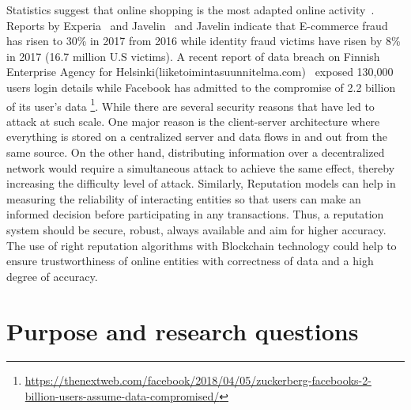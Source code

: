 Statistics suggest that online shopping is the most adapted online
activity~\cite{experian}. Reports by Experia~\cite{experian} and
Javelin~\cite{javelin} and Javelin indicate that E-commerce fraud has risen to
30\% in 2017 from 2016 while identity fraud victims have risen by 8\% in 2017
(16.7 million U.S victims). 
A recent report of data breach on Finnish Enterprise Agency for
Helsinki(liiketoimintasuunnitelma.com)~\cite{finland} exposed 130,000 users login details
while Facebook has admitted to the compromise of 2.2 billion of its user's data
\footnote{\url{https://thenextweb.com/facebook/2018/04/05/zuckerberg-facebooks-2-billion-users-assume-data-compromised/}}.
While there are several security reasons that have led to attack at such scale.
One major reason is the client-server architecture where everything is stored
on a centralized server and data flows in and out from the same source. On the
other hand, distributing information over a decentralized network would require
a simultaneous attack to achieve the same effect, thereby increasing the
difficulty level of attack. Similarly, Reputation models can help in measuring
the reliability of interacting entities so that users can make an informed
decision before participating in any transactions. Thus, a reputation system
should be secure, robust, always available and aim for higher accuracy. The use
of right reputation algorithms with Blockchain technology could help to ensure
trustworthiness of online entities with correctness of data and a high degree
of accuracy.  


\section{Purpose and research questions} \label{ResearchQuestions}

